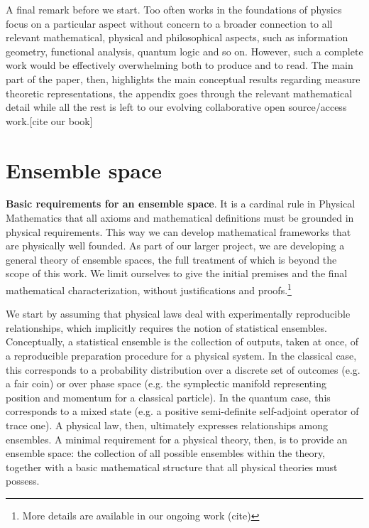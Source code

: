 \documentclass[10pt,twocolumn, nofootinbib]{revtex4-2}
\begin{document}
A final remark before we start. Too often works in the foundations of physics focus on a particular aspect without concern to a broader connection to all relevant mathematical, physical and philosophical aspects, such as information geometry, functional analysis, quantum logic and so on. However, such a complete work would be effectively overwhelming both to produce and to read. The main part of the paper, then, highlights the main conceptual results regarding measure theoretic representations, the appendix goes through the relevant mathematical detail while all the rest is left to our evolving collaborative open source/access work.[cite our book]

\section{Ensemble space}

\textbf{Basic requirements for an ensemble space}. It is a cardinal rule in Physical Mathematics that all axioms and mathematical definitions must be grounded in physical requirements. This way we can develop mathematical frameworks that are physically well founded. As part of our larger project, we are developing a general theory of ensemble spaces, the full treatment of which is beyond the scope of this work. We limit ourselves to give the initial premises and the final mathematical characterization, without justifications and proofs.\footnote{More details are available in our ongoing work (cite)}

We start by assuming that physical laws deal with experimentally reproducible relationships, which implicitly requires the notion of statistical ensembles. Conceptually, a statistical ensemble is the collection of outputs, taken at once, of a reproducible preparation procedure for a physical system. In the classical case, this corresponds to a probability distribution over a discrete set of outcomes (e.g. a fair coin) or over phase space (e.g. the symplectic manifold representing position and momentum for a classical particle). In the quantum case, this corresponds to a mixed state (e.g. a positive semi-definite self-adjoint operator of trace one). A physical law, then, ultimately expresses relationships among ensembles. A minimal requirement for a physical theory, then, is to provide an ensemble space: the collection of all possible ensembles within the theory, together with a basic mathematical structure that all physical theories must possess.
\end{document}
